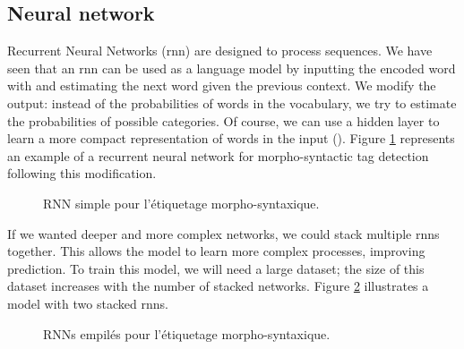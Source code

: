 \documentclass{KBook}
\begin{document}
\subsection{Neural network}

Recurrent Neural Networks (\ac{rnn}) are designed to process sequences. We have seen that an \ac{rnn} can be used as a language model by inputting the encoded word with  and estimating the next word given the previous context. We modify the output: instead of the probabilities of words in the vocabulary, we try to estimate the probabilities of possible categories. Of course, we can use a hidden layer to learn a more compact representation of words in the input (). Figure \ref{fig:pos-rnn1} represents an example of a recurrent neural network for morpho-syntactic tag detection following this modification.
\begin{figure}[ht]
	\centering
	\caption[RNN simple pour l'étiquetage morpho-syntaxique.]{RNN simple pour l'étiquetage morpho-syntaxique.}
	\label{fig:pos-rnn1}
\end{figure}

If we wanted deeper and more complex networks, we could stack multiple \ac{rnn}s together. This allows the model to learn more complex processes, improving prediction. To train this model, we will need a large dataset; the size of this dataset increases with the number of stacked networks. Figure \ref{fig:pos-rnn2} illustrates a model with two stacked \ac{rnn}s.
\begin{figure}[ht]
	\centering
	\caption[RNNs empilés pour l'étiquetage morpho-syntaxique.]{RNNs empilés pour l'étiquetage morpho-syntaxique.}
	\label{fig:pos-rnn2}
\end{figure}
\end{document}
